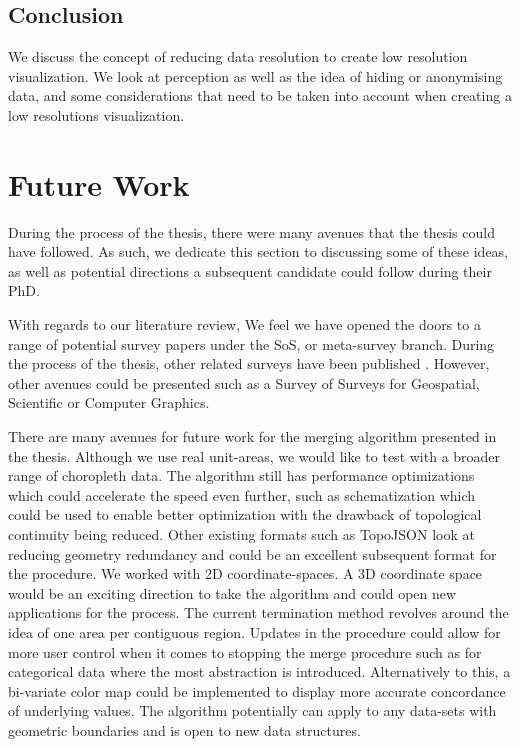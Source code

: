 \subsection{Conclusion}
We discuss the concept of reducing data resolution to create low resolution visualization. We look at perception as well as the idea of hiding or anonymising data, and some considerations that need to be taken into account when creating a low resolutions visualization.
\section{Future Work}
During the process of the thesis, there were many avenues that the thesis could have followed. As such, we dedicate this section to discussing some of these ideas, as well as potential directions a subsequent candidate could follow during their PhD.

With regards to our literature review, We feel we have opened the doors to a range of potential survey papers under the SoS, or meta-survey branch. During the process of the thesis, other related surveys have been published \cite{alharbi2017molecular, alharbi2018sos, rees2019survey}. However, other avenues could be presented such as a Survey of Surveys for Geospatial, Scientific or Computer Graphics.

There are many avenues for future work for the merging algorithm presented in the thesis. Although we use real unit-areas, we would like to test with a broader range of choropleth data. The algorithm still has performance optimizations which could accelerate the speed even further, such as schematization \cite{barkowsky2000schematizing} which could be used to enable better optimization with the drawback of topological continuity being reduced. Other existing formats such as TopoJSON \cite{bostock2018topojson} look at reducing geometry redundancy and could be an excellent subsequent format for the procedure. We worked with 2D coordinate-spaces. A 3D coordinate space would be an exciting direction to take the algorithm and could open new applications for the process. The current termination method revolves around the idea of one area per contiguous region. Updates in the procedure could allow for more user control when it comes to stopping the merge procedure such as for categorical data where the most abstraction is introduced. Alternatively to this, a bi-variate color map could be implemented to display more accurate concordance of underlying values.  The algorithm potentially can apply to any data-sets with geometric boundaries and is open to new data structures. 

